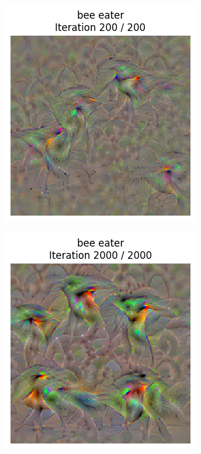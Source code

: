 \begin{figure}[H]
\begin{subfigure}[t]{.33\textwidth}
        \includegraphics[width=\linewidth]{figs_propre2/SqueezeNet/SqueezeNet_bird_animated_lr_0.5_last_frame.png}
        \caption{}
        \label{fig:class_viz_lr:sub2}
    \end{subfigure}%
    \begin{subfigure}[t]{.33\textwidth}
        \centering
        \includegraphics[width=\linewidth]{figs_propre2/SqueezeNet/SqueezeNet_bird_animated_2000_lr_0.5_last_frame.png}

\end{subfigure}
\end{figure}
